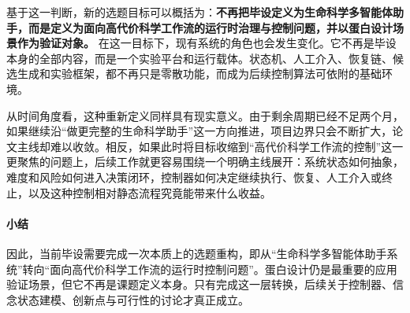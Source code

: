 基于这一判断，新的选题目标可以概括为：\textbf{不再把毕设定义为生命科学多智能体助手，而是定义为面向高代价科学工作流的运行时治理与控制问题，并以蛋白设计场景作为验证对象。} 在这一目标下，现有系统的角色也会发生变化。它不再是毕设本身的全部内容，而是一个实验平台和运行载体。状态机、人工介入、恢复链、候选生成和实验框架，都不再只是零散功能，而成为后续控制算法可依附的基础环境。

从时间角度看，这种重新定义同样具有现实意义。由于剩余周期已经不足两个月，如果继续沿“做更完整的生命科学助手”这一方向推进，项目边界只会不断扩大，论文主线却难以收敛。相反，如果此时将目标收缩到“高代价科学工作流的控制”这一更聚焦的问题上，后续工作就更容易围绕一个明确主线展开：系统状态如何抽象，难度和风险如何进入决策闭环，控制器如何决定继续执行、恢复、人工介入或终止，以及这种控制相对静态流程究竟能带来什么收益。

\paragraph{小结}
因此，当前毕设需要完成一次本质上的选题重构，即从“生命科学多智能体助手系统”转向“面向高代价科学工作流的运行时控制问题”。蛋白设计仍是最重要的应用验证场景，但它不再是课题定义本身。只有完成这一层转换，后续关于控制器、信念状态建模、创新点与可行性的讨论才真正成立。
